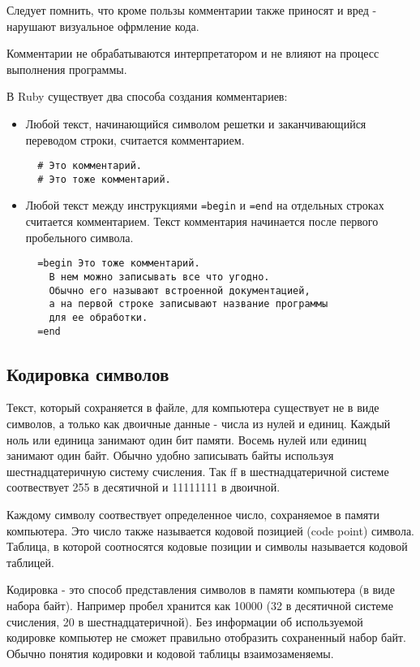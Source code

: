 Следует помнить, что кроме пользы комментарии также приносят и вред - нарушают визуальное офрмление кода.

Комментарии не обрабатываются интерпретатором и не влияют на процесс выполнения программы.

В Ruby существует два способа создания комментариев:
\begin{itemize}
  \item Любой текст, начинающийся символом решетки и заканчивающийся переводом строки, считается комментарием.
  \begin{verbatim}
  # Это комментарий.
  # Это тоже комментарий.
  \end{verbatim}

  \item Любой текст между инструкциями \verb!=begin! и \verb!=end! на отдельных строках считается комментарием. Текст комментария начинается после первого пробельного символа.
  \begin{verbatim}
  =begin Это тоже комментарий.
    В нем можно записывать все что угодно.
    Обычно его называют встроенной документацией,
    а на первой строке записывают название программы
    для ее обработки.
  =end
  \end{verbatim}
\end{itemize}

\subsection{Кодировка символов}

Текст, который сохраняется в файле, для компьютера существует не в виде символов, а только как двоичные данные - числа из нулей и единиц. Каждый ноль или единица занимают один бит памяти. Восемь нулей или единиц занимают один байт. Обычно удобно записывать байты используя шестнадцатеричную систему счисления. Так ff в шестнадцатеричной системе соотвествует 255 в десятичной и 11111111 в двоичной.

Каждому символу соотвествует определенное число, сохраняемое в памяти компьютера. Это число также называется кодовой позицией (code point) символа. Таблица, в которой соотносятся кодовые позиции и символы называется кодовой таблицей.

Кодировка - это способ представления символов в памяти компьютера (в виде набора байт). Например пробел хранится как 10000 (32 в десятичной системе счисления, 20 в шестнадцатеричной). Без информации об используемой кодировке компьютер не сможет правильно отобразить сохраненный набор байт. Обычно понятия кодировки и кодовой таблицы взаимозаменяемы.

